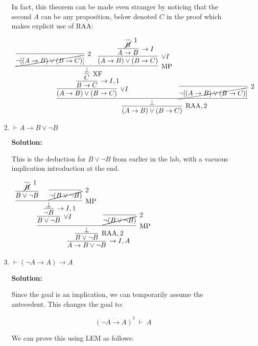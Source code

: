 \documentclass[11pt]{report}
\newcommand{\temp}[2]{{\overline{#2}}^{#1}}
\begin{document}
\begin{enumerate}
\begin{enumerate}
		In fact, this theorem can be made even stranger by noticing that the second $A$ can be any proposition, below denoted $C$ in the proof which makes explicit use of RAA: 
		\begin{small}
			\begin{center}
				$\begin{array}{c}
					\infer[\RAA,2]{(A \to B) \lor (B \to C)}
						{\infer[]{\bot}
							{\infer[\lor I]{(A \to B) \lor (B \to C)}
								{\infer[\to I,1]{B \to C}
									{\infer[\XF]{C}
										{\infer[\MP]{\bot}
											{\infer[2]{\cancel{\lnot[(A \to B) \lor (B \to C)]}}{}
											&
											\infer[\lor I]{(A \to B) \lor (B \to C)}
												{\infer[\to I]{A \to B}
													{\infer[1]{\cancel{B}}{}}}}}}}
							&
							\infer[2]{\cancel{\lnot[(A \to B) \lor (B \to C)]}}{}}}				
				\end{array}$
			\end{center}
		\end{small}		
		
		\item $\vdash A \to B \lor \neg B$  
		
		\textbf{Solution:}

		This is the deduction for $B \lor \lnot B$ from earlier in the lab, with a vacuous implication introduction at the end. 

		\begin{center}
			$\begin{array}{c}
				\infer[\to I, A]{A \to B \lor \lnot B}
					{\infer[\RAA,2]{B \lor \lnot B}
						{\infer[\MP]{\bot}
							{\infer[\lor I]{B \lor \lnot B}
								{\infer[\to I,1]{\lnot B}
									{\infer[\MP]{\bot}
										{\infer[]{B \lor \lnot B}{\infer[1]{\cancel{B}}{}}
										&
										\infer[2]{\cancel{\lnot (B \lor \lnot B)}}{}}}}
							&
							\infer[2]{\cancel{\lnot(B \lor \lnot B)}}{}}}}

			\end{array}$

		\end{center}
		
		\newpage
		\item $\vdash (\neg A \to A) \to A$  
		
		\textbf{Solution:}

		Since the goal is an implication, we can temporarily assume the antecedent. This changes the goal to: 

		$$\temp{1}{(\neg A \to A)} \ \vdash \ A$$

		We can prove this using LEM as follows: 


\end{enumerate}
\end{enumerate}
\end{document}
